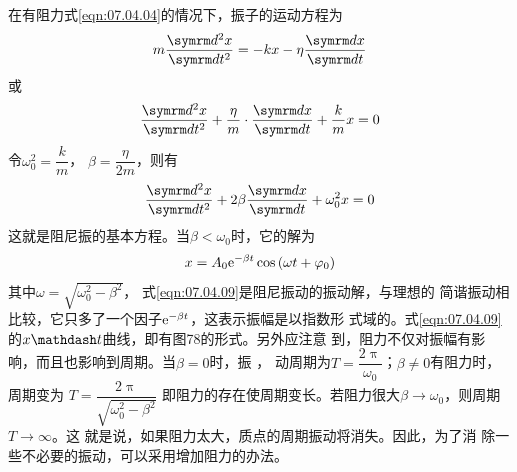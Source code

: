 在有阻力\lhbrak 式\eqref{eqn:07.04.04}\rhbrak 的情况下，振子的运动方程为
\begin{equation*}
  m \frac { \dif ^ { 2 } x } { \dif t ^ { 2 } } = - k x - \eta \frac { \dif x } { \dif t }
\end{equation*}
或\vspace{-1.56em}
\begin{equation*}
  \frac { \dif ^ { 2 } x } { \dif t ^ { 2 } } + \frac { \eta } { m } \cdot \frac { \dif x } { \dif t } + \frac { k } { m } x = 0
\end{equation*}
令$ \omega _ 0 ^ { 2 } = \dfrac { k } { m }  $， $ \beta = \dfrac { \eta } { 2 m } $，则有
\begin{equation}\label{eqn:07.04.08}
  \frac { \dif ^ { 2 } x } { \dif t ^ { 2 } } + 2 \beta \frac { \dif x } { \dif t } + \omega _ { 0 } ^ { 2 } x = 0
\end{equation}
这就是阻尼振的基本方程。当$  \beta < \omega _ { 0 }   $时，它的解为
\begin{equation}\label{eqn:07.04.09}
  x = A _ { 0 } \mathrm e ^ { - \beta t } \cos \left( \omega t + \varphi _ { 0 } \right)
\end{equation}
其中$\omega = \sqrt { \omega _ 0 ^ { 2 } - \beta ^ { 2 } } $， 式\eqref{eqn:07.04.09}是阻尼振动的振动解，与理想的
简谐振动相比较，它只多了一个因子$ \mathrm e ^ { - \beta t } $，这表示振幅是以指数形
式域的。式\eqref{eqn:07.04.09}的$ x \mathdash t  $曲线，即有图78的形式。另外应注意
到，阻力不仅对振幅有影响，而且也影响到周期。当$  \beta = 0   $时，振
， \beta
动周期为$ T = \dfrac { 2 \uppi } { \omega _ { 0 } }  $；$  \beta \ne 0   $有阻力时，周期变为
$ T = \dfrac { 2 \uppi } { \sqrt { \omega _ { 0 } ^ { 2 } - \beta ^ { 2 } } } $
即阻力的存在使周期变长。若阻力很大$ \beta \to \omega _ { 0 } $，则周期$ T \to \infty $。这
就是说，如果阻力太大，质点的周期振动将消失。因此，为了消
除一些不必要的振动，可以采用增加阻力的办法。